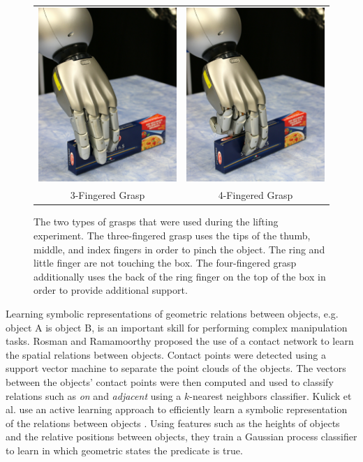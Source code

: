 \begin{figure}
\begin{centering}
\begin{tabular}{cc}
\includegraphics[width=0.23\columnwidth]{oli/PicsforIROS2014/3FingGrasp} & \includegraphics[width=0.23\columnwidth]{oli/PicsforIROS2014/4FingGrasp}\tabularnewline
3-Fingered Grasp & 4-Fingered Grasp\tabularnewline
\end{tabular}
\par\end{centering}

\caption{\label{fig:Grasp-types}The two types of grasps that were used during
the lifting experiment. The three-fingered grasp uses the tips of
the thumb, middle, and index fingers in order to pinch the object. The ring and little finger are not touching the box.
The four-fingered grasp additionally uses the back of the ring finger
on the top of the box in order to provide additional support. }
\end{figure}
Learning symbolic representations of geometric relations between objects,
e.g. object A is  object B, is an important skill for performing
complex manipulation tasks. Rosman and Ramamoorthy \cite{ContactNetwork}
proposed the use of a contact network to learn the spatial relations
between objects. Contact points were detected using a support vector
machine to separate the point clouds of the objects. The vectors between
the objects' contact points were then computed and used to classify
relations such as \emph{on} and \emph{adjacent} using a $k$-nearest
neighbors classifier. Kulick et al. use an active learning approach
to efficiently learn a symbolic representation of the relations between
objects \cite{kulickSymbolLearning}. Using features such as the heights
of objects and the relative positions between objects, they train
a Gaussian process classifier to learn in which geometric states the
predicate is true. 

